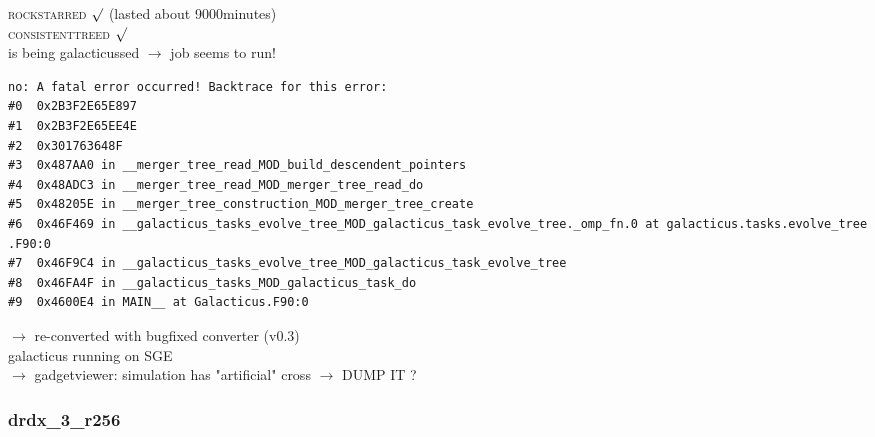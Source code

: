 \documentclass[a4paper,11pt,fleqn,oneside]{book}
\begin{document}
\textsc{rockstarred} $\surd$ (lasted about 9000minutes) \\
\textsc{consistenttreed} $\surd$ \\ 
is being galacticussed $\rightarrow$ job seems to run! \\
\begin{verbatim}
no: A fatal error occurred! Backtrace for this error:
#0  0x2B3F2E65E897
#1  0x2B3F2E65EE4E
#2  0x301763648F
#3  0x487AA0 in __merger_tree_read_MOD_build_descendent_pointers
#4  0x48ADC3 in __merger_tree_read_MOD_merger_tree_read_do
#5  0x48205E in __merger_tree_construction_MOD_merger_tree_create
#6  0x46F469 in __galacticus_tasks_evolve_tree_MOD_galacticus_task_evolve_tree._omp_fn.0 at galacticus.tasks.evolve_tree
.F90:0
#7  0x46F9C4 in __galacticus_tasks_evolve_tree_MOD_galacticus_task_evolve_tree
#8  0x46FA4F in __galacticus_tasks_MOD_galacticus_task_do
#9  0x4600E4 in MAIN__ at Galacticus.F90:0
\end{verbatim}
$\rightarrow$ re-converted with bugfixed converter (v0.3) \\
galacticus running on SGE \\
$\rightarrow$ gadgetviewer: simulation has "artificial" cross 
$\rightarrow$ DUMP IT ?


\newpage
\subsubsection{drdx\_3\_r256}
\end{document}
